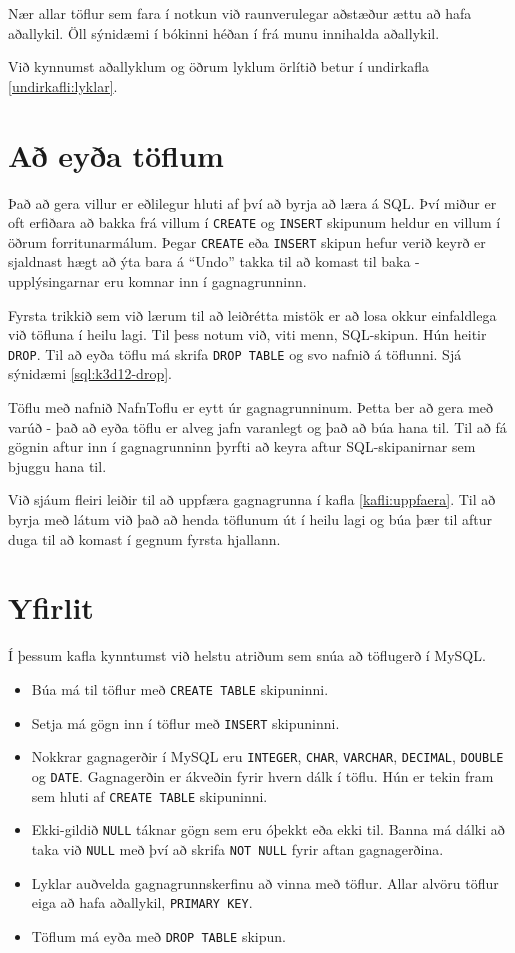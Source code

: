 Nær allar töflur sem fara í notkun við raunverulegar aðstæður ættu að hafa aðallykil. Öll sýnidæmi í bókinni héðan í frá munu innihalda aðallykil.

Við kynnumst aðallyklum og öðrum lyklum örlítið betur í undirkafla \ref{undirkafli:lyklar}.
\section{Að eyða töflum} %
\label{undirkafli:drop}
Það að gera villur er eðlilegur hluti af því að byrja að læra á SQL. Því miður er oft erfiðara að bakka frá villum í \verb|CREATE| og \verb|INSERT| skipunum heldur en villum í öðrum forritunarmálum. Þegar \verb|CREATE| eða \verb|INSERT| skipun hefur verið keyrð er sjaldnast hægt að ýta bara á ``Undo'' takka til að komast til baka - upplýsingarnar eru komnar inn í gagnagrunninn.

Fyrsta trikkið sem við lærum til að leiðrétta mistök er að losa okkur einfaldlega við töfluna í heilu lagi. Til þess notum við, viti menn, SQL-skipun. Hún heitir \verb|DROP|. Til að eyða töflu má skrifa \verb|DROP TABLE| og svo nafnið á töflunni. Sjá sýnidæmi \ref{sql:k3d12-drop}.

\begin{example}
\caption[DROP TABLE]{Töflu með nafnið NafnToflu er eytt úr gagnagrunninum. Þetta ber að gera með varúð - það að eyða töflu er alveg jafn varanlegt og það að búa hana til. Til að fá gögnin aftur inn í gagnagrunninn þyrfti að keyra aftur SQL-skipanirnar sem bjuggu hana til.}
\label{sql:k3d12-drop}
\centering
{}
\end{example}

Við sjáum fleiri leiðir til að uppfæra gagnagrunna í kafla \ref{kafli:uppfaera}. Til að byrja með látum við það að henda töflunum út í heilu lagi og búa þær til aftur duga til að komast í gegnum fyrsta hjallann.

\section{Yfirlit}
Í þessum kafla kynntumst við helstu atriðum sem snúa að töflugerð í MySQL.

\begin{itemize}
 \item Búa má til töflur með \verb|CREATE TABLE| skipuninni.
 \item Setja má gögn inn í töflur með \verb|INSERT| skipuninni.
 \item Nokkrar gagnagerðir í MySQL eru \verb|INTEGER|, \verb|CHAR|, \verb|VARCHAR|, \verb|DECIMAL|, \verb|DOUBLE| og \verb|DATE|. Gagnagerðin er ákveðin fyrir hvern dálk í töflu. Hún er tekin fram sem hluti af \verb|CREATE TABLE| skipuninni.
 \item Ekki-gildið \verb|NULL| táknar gögn sem eru óþekkt eða ekki til. Banna má dálki að taka við \verb|NULL| með því að skrifa \verb|NOT NULL| fyrir aftan gagnagerðina.
 \item Lyklar auðvelda gagnagrunnskerfinu að vinna með töflur. Allar alvöru töflur eiga að hafa aðallykil, \verb|PRIMARY KEY|.
 \item Töflum má eyða með \verb|DROP TABLE| skipun.
\end{itemize}
